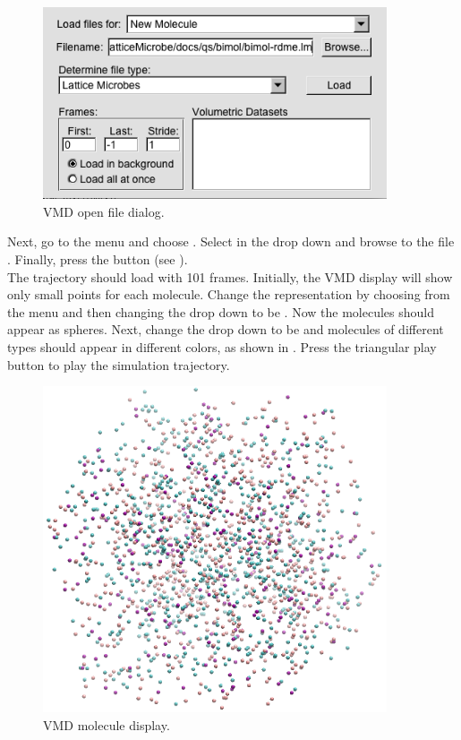 \begin{figure}
\centerline{\includegraphics[width=4in]{Tutorials/VMDOpen.png}}
\caption{VMD open file dialog.}
\label{fig:VMDOpen}
\end{figure}

Next, go to the menu and choose . Select  in the  drop down and browse to the file . Finally, press the  button (see ).\\

The trajectory should load with 101 frames. Initially, the VMD  display will show only small points for each molecule. Change the representation by choosing  from the menu and then changing the  drop down to be . Now the molecules should appear as spheres. Next, change the  drop down to be  and molecules of different types should appear in different colors, as shown in . Press the triangular play button to play the simulation trajectory.\\

\begin{figure}
\centerline{\includegraphics[width=4in]{Tutorials/VMDMolecules.png}}
\caption{VMD molecule display.}
\label{fig:VMDMolecules}
\end{figure}

